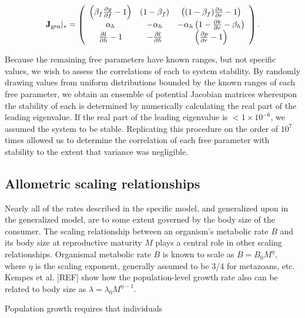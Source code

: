 \documentclass[12pt,english]{article}
\begin{document}
\begin{spacing}{1.9}
\begin{equation}
\mathbf{J}_{\rm gen}|_* =
\left(
\begin{array}{ccc}
 \left(\beta_f \frac{\partial g}{\partial f} - 1 \right) & (1-\beta_f) & \left( (1-\beta_f)\frac{\partial s}{\partial r} - 1 \right) \\
 \alpha_h & -\alpha_h & -\alpha_h \left(1-\frac{\partial k}{\partial r} - \beta_h  \right) \\
 \frac{\partial l}{\partial h}-1 & -\frac{\partial l}{\partial h} &  \left( \frac{\partial p}{\partial r} - 1 \right) \\
\end{array}
\right).
\label{eq_Jacgen}
\end{equation}

Because the remaining free parameters have known ranges, but not specific values, we wish to assess the correlations of each to system stability.
By randomly drawing values from uniform distributions bounded by the known ranges of each free parameter, we obtain an ensemble of potential Jacobian matrices whereupon the stability of each is determined by numerically calculating the real part of the leading eigenvalue.
If the real part of the leading eigenvalue is $<1\times10^{-6}$, we assumed the system to be stable.
Replicating this procedure on the order of $10^7$ times allowed us to determine the correlation of each free parameter with stability to the extent that variance was negligible.



\subsection{Allometric scaling relationships}

Nearly all of the rates described in the specific model, and generalized upon in the generalized model, are to some extent governed by the body size of the consumer.
The scaling relationship between an organism's metabolic rate $B$ and its body size at reproductive maturity $M$ plays a central role in other scaling relationships.
Organismal metabolic rate $B$ is known to scale as $B = B_0 M^\eta$, where $\eta$ is the scaling exponent, generally assumed to be 3/4 for metazoans, etc.
Kempes et al. [REF] show how the population-level growth rate also can be related to body size as $\lambda = \lambda_0 M^{\eta-1}$.

Population growth requires that individuals 





\end{spacing}
\end{document}
